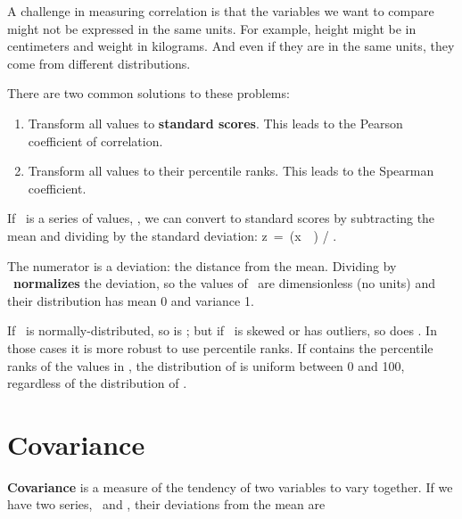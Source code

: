 \documentclass[12pt]{book}
\begin{document}
A challenge in measuring correlation is that the variables we want
to compare might not be expressed in the same units.  For example, height
might be in centimeters and weight in kilograms.  And even if they are
in the same units, they come from different distributions.

There are two common solutions to these problems:

\begin{enumerate}

\item Transform all values to {\bf standard scores}.  This leads to
the Pearson coefficient of correlation.

\item Transform all values to their percentile ranks.  This
leads to the Spearman coefficient.

\end{enumerate}

If \X~is a series of values, \xsubi, we can convert to standard
scores by subtracting the mean and dividing by the standard deviation:
z~=~(x~\minus~\mymu) / \mysigma.

The numerator is a deviation: the distance from the mean.  Dividing by
\mysigma~{\bf normalizes} the deviation, so the values of \Z~are
dimensionless (no units) and their distribution has mean 0 and
variance 1.

If \X~is normally-distributed, so is \Z; but if \X~is skewed or has
outliers, so does \Z.  In those cases it is more robust to use
percentile ranks.  If \R contains the percentile ranks of the
values in \X, the distribution of \R is uniform between 0 and 100,
regardless of the distribution of \X.

\section{Covariance}

{\bf Covariance} is a measure of the tendency of two variables
to vary together.  If we have two series, \X~and \Y, their
deviations from the mean are
\end{document}
